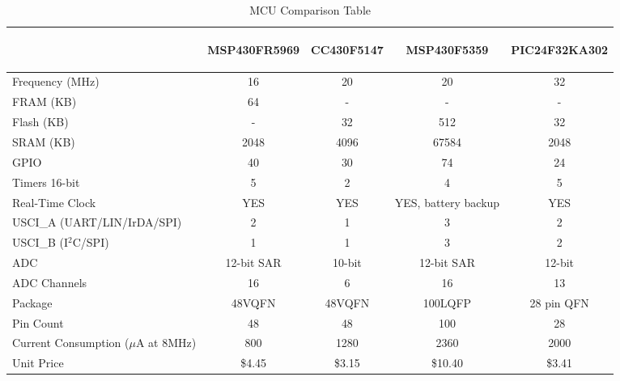 \begin{table}[H]
\setlength{\extrarowheight}{1.5pt}
  \centering
  \caption{MCU Comparison Table}
    \begin{tabular}{|m{1.5in}|c|c|c|c|}
    \cline{2-5}
    \multicolumn{1}{c|}{} & \begin{sideways}MSP430FR5969 \end{sideways} &\begin{sideways} CC430F5147 \end{sideways}& \begin{sideways}MSP430F5359 \end{sideways}& \begin{sideways}PIC24F32KA302\end{sideways}\\ 
    \hline
    Frequency (MHz) & 16    & 20    & 20    & 32\\ \hline
    FRAM (KB) & 64    & -     & -     & -\\ \hline
    Flash (KB) & -     & 32    & 512   & 32\\ \hline
    SRAM (KB) & 2048  & 4096  & 67584 & 2048 \\ \hline
    GPIO  & 40    & 30    & 74    & 24    \\ \hline
    Timers 16-bit & 5     & 2     & 4     & 5     \\ \hline
    Real-Time Clock & YES   & YES   & YES, battery backup & YES   \\ \hline
    USCI\_A (UART/LIN/IrDA/SPI) & 2     & 1     & 3     & 2     \\ \hline
    USCI\_B (I$^2$C/SPI) & 1     & 1     & 3     & 2     \\ \hline
    ADC   & 12-bit SAR & 10-bit & 12-bit SAR & 12-bit \\ \hline
    ADC Channels & 16    & 6     & 16    & 13    \\ \hline
    Package & 48VQFN & 48VQFN & 100LQFP & 28 pin QFN \\ \hline
    Pin Count & 48    & 48    & 100   & 28    \\ \hline
    Current Consumption ($\mu$A at 8MHz) & 800   & 1280  & 2360  & 2000  \\ \hline
    Unit Price & \$4.45  & \$3.15  & \$10.40 & \$3.41  \\ \hline
    \end{tabular}%
  \label{tab:mcuComp}%
\end{table}%
